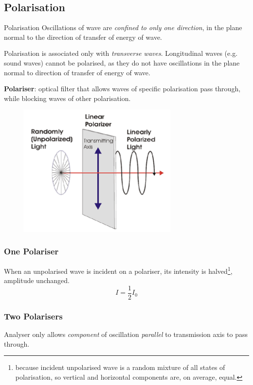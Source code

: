 \subsection{Polarisation}
\begin{defn}{Polarisation}{}
Oscillations of wave are \emph{confined to only one direction}, in the plane normal to the direction of transfer of energy of wave.
\end{defn}

\begin{remark}
Polarisation is associated only with \emph{transverse waves}. Longitudinal waves (e.g. sound waves) cannot be polarised, as they do not have oscillations in the plane normal to direction of transfer of energy of wave.
\end{remark}

\textbf{Polariser}: optical filter that allows waves of specific polarisation pass through, while blocking waves of other polarisation.

\begin{figure}[H]
    \centering
    \includegraphics[width=8cm]{images/polarisation.png}
\end{figure}

\subsubsection{One Polariser}
When an unpolarised wave is incident on a polariser, its intensity is halved\footnote{because incident unpolarised wave is a random mixture of all states of polarisation, so vertical and horizontal components are, on average, equal.}, amplitude unchanged.
\begin{equation}
I=\frac{1}{2}I_0
\end{equation}

\subsubsection{Two Polarisers}
Analyser only allows \emph{component} of oscillation \emph{parallel} to transmission axis to pass through.

